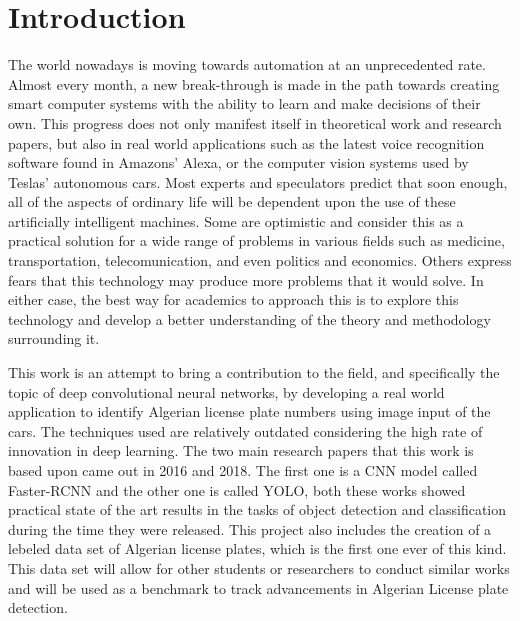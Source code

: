 \chapter*{Introduction}

The world nowadays is moving towards automation at an unprecedented rate. Almost every month, a new break-through is made in the path towards creating smart computer systems with the ability to learn and make decisions of their own. This progress does not only manifest itself in theoretical work and research papers, but also in real world applications such as the latest voice recognition software found in Amazons' Alexa, or the computer vision systems used by Teslas' autonomous cars. Most experts and speculators predict that soon enough, all of the aspects of ordinary life will be dependent upon the use of these artificially intelligent machines. Some are optimistic and consider this as a practical solution for a wide range of problems in various fields such as medicine, transportation, telecomunication, and even politics and economics. Others express fears that this technology may produce more problems that it would solve. In either case, the best way for academics to approach this is to explore this technology and develop a better understanding of the theory and methodology surrounding it.

This work is an attempt to bring a contribution to the field, and specifically the topic of deep convolutional neural networks, by developing a real world application to identify Algerian license plate numbers using image input of the cars. The techniques used are relatively outdated considering the high rate of innovation in deep learning. The two main research papers that this work is based upon came out in 2016 and 2018. The first one is a CNN model called Faster-RCNN and the other one is called YOLO, both these works showed practical state of the art results in the tasks of object detection and classification during the time they were released. This project also includes the creation of a lebeled data set of Algerian license plates, which is the first one ever of this kind. This data set will allow for other students or researchers to conduct similar works and will be used as a benchmark to track advancements in Algerian License plate detection.
